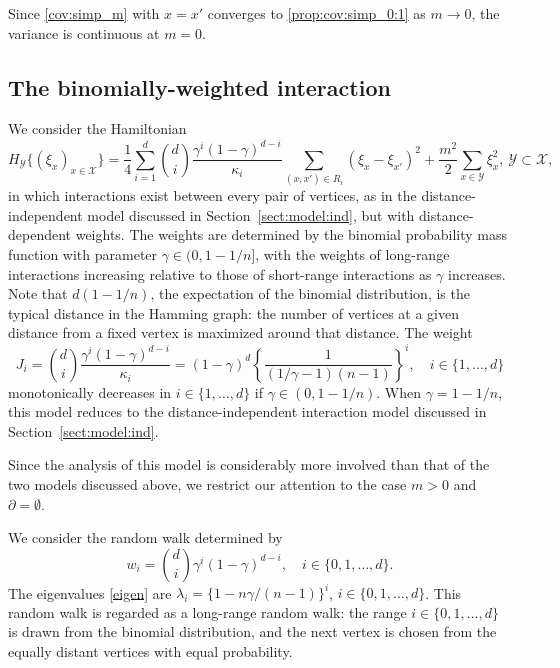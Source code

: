 \documentclass[a4paper,11pt]{article}
\theoremstyle{plain}
\theoremstyle{definition}
\begin{document}
Since \eqref{cov:simp_m} with $x=x'$ converges to
\eqref{prop:cov:simp_0:1} as $m\to 0$, the variance
is continuous at $m=0$.

\subsection{The binomially-weighted interaction}
\label{sect:model:binom}

We consider the Hamiltonian
\begin{equation}\label{ham_bin}
  H_\mathcal{Y}\{(\xi_x)_{x\in\mathcal{X}}\}
  =\frac{1}{4}\sum_{i=1}^d{d\choose i}
  \frac{\gamma^i(1-\gamma)^{d-i}}{\kappa_i}
  \sum_{(x,x')\in R_i}(\xi_x-\xi_{x'})^2
  +\frac{m^2}{2}\sum_{x\in\mathcal{Y}}\xi_x^2,
  ~ \mathcal{Y}\subset\mathcal{X},
\end{equation}
in which interactions exist between every pair of
vertices, as in the distance-independent model
discussed in Section~\ref{sect:model:ind}, but with
distance-dependent weights. The weights are determined
by the binomial probability mass function with
parameter $\gamma\in{(0,1-1/n]}$, with
the weights of long-range interactions increasing
relative to those of short-range interactions as $\gamma$
increases.
Note that $d(1-1/n)$, the expectation of the binomial
distribution, is the typical distance in the Hamming
graph: the number of vertices at a given distance from
a fixed vertex is maximized around that distance.
The weight
\[
  J_i={d\choose i}
  \frac{\gamma^i(1-\gamma)^{d-i}}{\kappa_i}=
  (1-\gamma)^d\left\{\frac{1}{(1/\gamma-1)(n-1)}\right\}^i,
  \quad i\in \{1,\ldots,d\}
\]  
monotonically decreases in $i\in\{1,\ldots,d\}$ if
$\gamma\in(0,1-1/n)$. %
When $\gamma=1-1/n$, this model reduces to the
distance-independent interaction model discussed in
Section~\ref{sect:model:ind}.

Since the analysis of this model is considerably
more involved than that of the two models discussed
above, we restrict our attention to the case $m>0$
and $\partial=\emptyset$.

We consider the random walk determined by 
\[
  w_i={d\choose i}\gamma^i(1-\gamma)^{d-i},
  \quad i\in\{0,1,\ldots,d\}.
\]
The eigenvalues \eqref{eigen} are 
$\lambda_i=\{1-n\gamma/(n-1)\}^i$, $i\in\{0,1,\ldots,d\}$.
This random walk is regarded as a long-range random
walk: the range $i\in\{0,1,\ldots,d\}$ is drawn from
the binomial distribution, and the next vertex is
chosen from the equally distant vertices with equal
probability.
\end{document}
